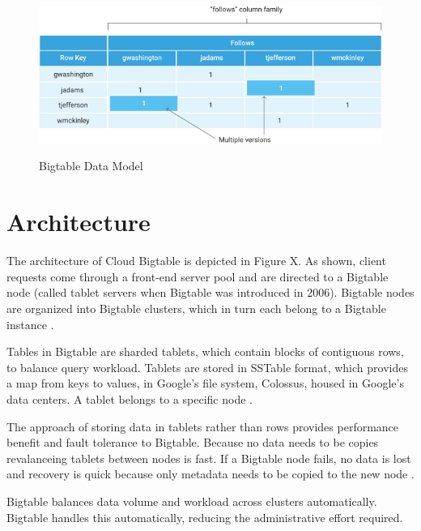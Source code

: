\documentclass[9pt,twocolumn,twoside]{styles/osajnl}
\begin{document}
\begin{figure}[ht]
  \includegraphics[scale=0.45]{images/bigtable-example.jpg}
  \caption{Bigtable Data Model}\cite{www-bigtabledocoverview}
\end{figure}

\section{Architecture}

The architecture of Cloud Bigtable is depicted in Figure X.  As shown, client requests come through a front-end server pool and are directed to a Bigtable node (called tablet servers when Bigtable was introduced in 2006). Bigtable nodes are organized into Bigtable clusters, which in turn each belong to a Bigtable instance \cite{www-bigtabledocoverview}.

Tables in Bigtable are sharded tablets, which contain blocks of contiguous rows, to balance query workload. Tablets are stored in SSTable format, which provides a map from keys to values, in Google's file system, Colossus, housed in Google's data centers. A tablet belongs to a specific node \cite{www-bigtabledocoverview}.

The approach of storing data in tablets rather than rows provides performance benefit and fault tolerance to Bigtable. Because no data needs to be copies revalanceing tablets between nodes is fast. If a Bigtable node fails, no data is lost and recovery is quick because only metadata needs to be copied to the new node  \cite{www-bigtabledocoverview}.

Bigtable balances data volume and workload across clusters automatically. Bigtable handles this automatically, reducing the administrative effort required\cite{www-bigtabledocoverview}.


\vspace{-\topsep}
\end{document}
